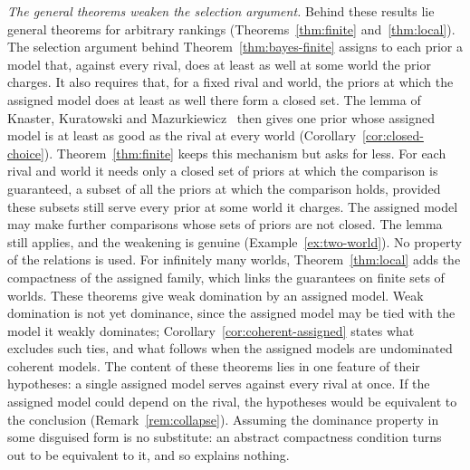 \documentclass[11pt]{article}
\theoremstyle{definition}
\theoremstyle{remark}
\begin{document}
\emph{The general theorems weaken the selection argument.} Behind these results lie general theorems for arbitrary rankings (Theorems~\ref{thm:finite} and~\ref{thm:local}). The selection argument behind Theorem~\ref{thm:bayes-finite} assigns to each prior a model that, against every rival, does at least as well at some world the prior charges. It also requires that, for a fixed rival and world, the priors at which the assigned model does at least as well there form a closed set. The lemma of Knaster, Kuratowski and Mazurkiewicz~\cite{KKM} then gives one prior whose assigned model is at least as good as the rival at every world (Corollary~\ref{cor:closed-choice}). Theorem~\ref{thm:finite} keeps this mechanism but asks for less. For each rival and world it needs only a closed set of priors at which the comparison is guaranteed, a subset of all the priors at which the comparison holds, provided these subsets still serve every prior at some world it charges. The assigned model may make further comparisons whose sets of priors are not closed. The lemma still applies, and the weakening is genuine (Example~\ref{ex:two-world}). No property of the relations is used. For infinitely many worlds, Theorem~\ref{thm:local} adds the compactness of the assigned family, which links the guarantees on finite sets of worlds. These theorems give weak domination by an assigned model. Weak domination is not yet dominance, since the assigned model may be tied with the model it weakly dominates; Corollary~\ref{cor:coherent-assigned} states what excludes such ties, and what follows when the assigned models are undominated coherent models. The content of these theorems lies in one feature of their hypotheses: a single assigned model serves against every rival at once. If the assigned model could depend on the rival, the hypotheses would be equivalent to the conclusion (Remark~\ref{rem:collapse}). Assuming the dominance property in some disguised form is no substitute: an abstract compactness condition turns out to be equivalent to it, and so explains nothing.
\end{document}
